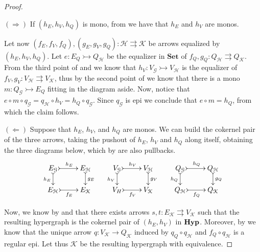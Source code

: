 \documentclass[a4paper,UKenglish,cleveref,pdftex,thm-restate,numberwithinsect]{lipics-v2021}
\newcommand{\Set}{\mathbf{Set}}
\newcommand{\catname}[1]{\textbf{\textup{#1}}}
\newcommand{\hyp}{\catname{Hyp}}
\newcommand{\mto}{\rightarrowtail}
\begin{document}
\mn*

\begin{proof}\label{proof:regmono}

$(\Rightarrow)$	If $(h_E, h_V, h_Q)$ is mono, from  we have that $h_E$ and $h_V$ are monos.

\noindent
	\parbox{11cm}{
		\hspace{15pt}Let now $(f_E, f_V, f_Q), (g_E, g_V, g_Q): \mathcal{H\rightrightarrows K}$ be arrows equalized by $(h_E, h_V, h_Q)$. Let $e\colon E_Q\mto Q_{\mathcal{H}}$ be the equalizer in
	$\Set$ of $f_Q, g_Q\colon Q_{\mathcal{H}}\rightrightarrows Q_{\mathcal{K}}$. From the third point of  and  we know that $h_V\colon V_{\mathcal{G}}\mto V_{\mathcal{H}} $ 
	is the equalizer of $f_V, g_V\colon V_{\mathcal{H}}\rightrightarrows V_{\mathcal{K}}$, thus by the second point of  we know that there is a mono 
	$m\colon Q_{\mathcal{G}}\mto E_Q$ fitting in the diagram aside. Now, notice that 
	$e\circ m\circ q_{\mathcal{G}}=q_\mathcal{H}\circ h_V=h_{Q}\circ q_{\mathcal{G}}$.
	Since $q_{\mathcal{G}}$ is epi we conclude that $e\circ m=h_Q$, from which the claim follows.}
	\hfill
	\parbox{2cm}{}   
	
	$(\Leftarrow)$ Suppose that $h_E$, $h_V$, and $h_Q$  are monos. 
	We can build the cokernel pair of the three arrows, taking the pushout of $h_E$, $h_V$ and $h_Q$ along itself, obtaining the three diagrams below, which by  are also pullbacks.
	\[     \xymatrix@R=15pt{
	E_\mathcal{G} \ar@{>->}[d]_{h_E} \ar@{>->}[r]^{h_E}&E_\mathcal{H} \ar@{>->}[d]^{g_E} &	V_\mathcal{G} \ar@{>->}[d]_{h_V} \ar@{>->}[r]^{h_V}& V_\mathcal{H} \ar@{>->}[d]^{g_V} &Q_\mathcal{G} \ar@{>->}[d]_{h_Q} \ar@{>->}[r]^{h_Q}& Q_\mathcal{H} \ar@{>->}[d]^{g_Q} \\
		E_\mathcal{H} \ar@{>->}[r]_{f_E} & E_\mathcal{{K}} & V_H \ar@{>->}[r]_{f_V} & V_\mathcal{{K}} & Q_\mathcal{H} \ar@{>->}[r]_{f_Q} & Q_\mathcal{{K}}
	}
	\]   
	
	Now, we know by  and  that there exists arrows $s,t\colon E_{\mathcal{K}}\rightrightarrows V_{\mathcal{K}}$ such that the resulting hypergraph is the cokernel pair of $(h_E, h_V)$ in $\hyp$. Moreover, by  we know that the unique arrow $q\colon V_{\mathcal{K}}\to Q_{\mathcal{K}}$
	induced by $q_{Q}\circ q_{\mathcal{H}}$ and $f_{Q}\circ q_{\mathcal{H}}$ is a regular epi. Let thus $\mathcal{K}$ be the resulting hypergraph with equivalence.
	

\end{proof}
\end{document}

